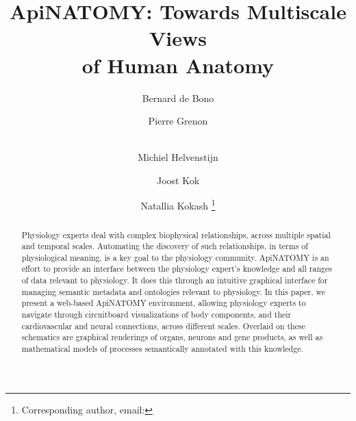 \documentclass[runningheads]{llncs}                                                      %
\begin{document}

\title{ApiNATOMY: Towards Multiscale Views\\of Human Anatomy}

\author{
  Bernard de Bono
  \and
  Pierre Grenon
  \and\\
  Michiel Helvenstijn
  \and 	
  Joost Kok
  \and
  Natallia Kokash
  \fnmsep
  \thanks{Corresponding author, email: }
}


\maketitle

\setlength{\subfigcapskip}{0.1cm}
\setlength{\abovecaptionskip}{0cm}
\setlength{\belowcaptionskip}{0cm}
\setlength{\textfloatsep}{10pt plus 1.0pt minus 2.0pt}


\begin{abstract}
	Physiology experts deal with complex biophysical relationships, across multiple spatial
	and temporal scales. Automating the discovery of such relationships, in terms of
	physiological meaning, is a key goal to the physiology community. ApiNATOMY is an effort
	to provide an interface between the physiology expert's knowledge and all ranges of data
	relevant to physiology. It does this through an intuitive graphical interface for managing
	semantic metadata and ontologies relevant to physiology. In this paper, we present a
	web-based ApiNATOMY environment, allowing physiology experts to navigate through circuitboard
	visualizations of body components, and their cardiovascular and neural connections,
	across different scales.
	Overlaid on these schematics are graphical renderings of organs, neurons and gene products,
	as well as mathematical models of processes semantically annotated with this knowledge.
\end{abstract}
\end{document}
